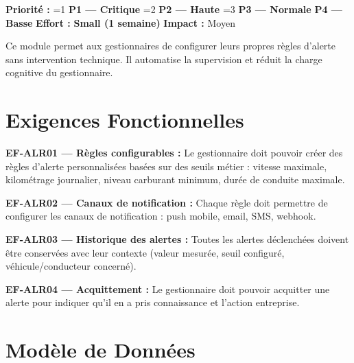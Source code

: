 \documentclass[12pt,a4paper]{report}
\newcommand{\prio}[1]{%
  \ifnum#1=1 \textcolor{fleeterror}{\textbf{P1 — Critique}}%
  \else\ifnum#1=2 \textcolor{fleetwarning}{\textbf{P2 — Haute}}%
  \else\ifnum#1=3 \textcolor{fleetsuccess}{\textbf{P3 — Normale}}%
  \else \textcolor{fleetgray}{\textbf{P4 — Basse}}%
  \fi\fi\fi}
\newcommand{\effort}[1]{\textcolor{fleetpurple}{\textbf{#1}}}
\begin{document}
\begin{tcolorbox}[colback=fleeterror!5, colframe=fleeterror, title={\bfseries Résumé du Module}, fonttitle=\color{white}]
\textbf{Priorité :} \prio{3} \quad \textbf{Effort :} \effort{Small (1 semaine)} \quad \textbf{Impact :} Moyen

Ce module permet aux gestionnaires de configurer leurs propres règles d'alerte sans intervention technique. Il automatise la supervision et réduit la charge cognitive du gestionnaire.
\end{tcolorbox}

\section{Exigences Fonctionnelles}

\begin{reqbox}
\textbf{EF-ALR01 — Règles configurables :} Le gestionnaire doit pouvoir créer des règles d'alerte personnalisées basées sur des seuils métier : vitesse maximale, kilométrage journalier, niveau carburant minimum, durée de conduite maximale.
\end{reqbox}

\begin{reqbox}
\textbf{EF-ALR02 — Canaux de notification :} Chaque règle doit permettre de configurer les canaux de notification : push mobile, email, SMS, webhook.
\end{reqbox}

\begin{reqbox}
\textbf{EF-ALR03 — Historique des alertes :} Toutes les alertes déclenchées doivent être conservées avec leur contexte (valeur mesurée, seuil configuré, véhicule/conducteur concerné).
\end{reqbox}

\begin{reqbox}
\textbf{EF-ALR04 — Acquittement :} Le gestionnaire doit pouvoir acquitter une alerte pour indiquer qu'il en a pris connaissance et l'action entreprise.
\end{reqbox}

\section{Modèle de Données}
\end{document}
